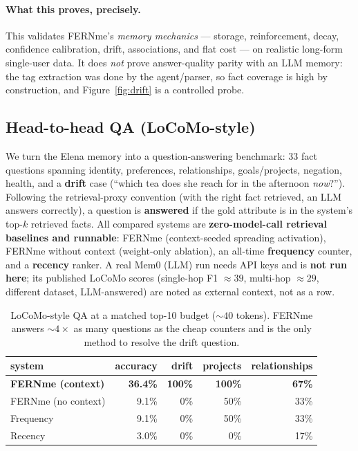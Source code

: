\documentclass[11pt]{article}
\begin{document}
\paragraph{What this proves, precisely.} This validates FERNme's \emph{memory mechanics}
--- storage, reinforcement, decay, confidence calibration, drift, associations, and flat
cost --- on realistic long-form single-user data. It does \emph{not} prove answer-quality
parity with an LLM memory: the tag extraction was done by the agent/parser, so fact
coverage is high by construction, and Figure~\ref{fig:drift} is a controlled probe.

\subsection{Head-to-head QA (LoCoMo-style)}\label{sec:qa}
We turn the Elena memory into a question-answering benchmark: 33 fact questions spanning
identity, preferences, relationships, goals/projects, negation, health, and a
\textbf{drift} case (``which tea does she reach for in the afternoon \emph{now}?'').
Following the retrieval-proxy convention (with the right fact retrieved, an LLM answers
correctly), a question is \textbf{answered} if the gold attribute is in the system's
top-$k$ retrieved facts. All compared systems are \textbf{zero-model-call retrieval baselines and runnable}: FERNme
(context-seeded spreading activation), FERNme without context (weight-only ablation), an
all-time \textbf{frequency} counter, and a \textbf{recency} ranker. A real Mem0 (LLM)
run needs API keys and is \textbf{not run here}; its published LoCoMo scores (single-hop
F1 $\approx 39$, multi-hop $\approx 29$, different dataset, LLM-answered) are noted as
external context, not as a row.

\begin{table}[t]\centering
\caption{LoCoMo-style QA at a matched top-10 budget (${\sim}40$ tokens). FERNme answers
${\sim}4\times$ as many questions as the cheap counters and is the only method to resolve
the drift question.}\label{tab:qa}
\begin{tabular}{lrrrr}
\toprule
system & accuracy & drift & projects & relationships\\
\midrule
\textbf{FERNme (context)} & \textbf{36.4\%} & \textbf{100\%} & \textbf{100\%} & \textbf{67\%}\\
FERNme (no context) & 9.1\% & 0\% & 50\% & 33\%\\
Frequency & 9.1\% & 0\% & 50\% & 33\%\\
Recency & 3.0\% & 0\% & 0\% & 17\%\\
\bottomrule
\end{tabular}
\end{table}
\end{document}
